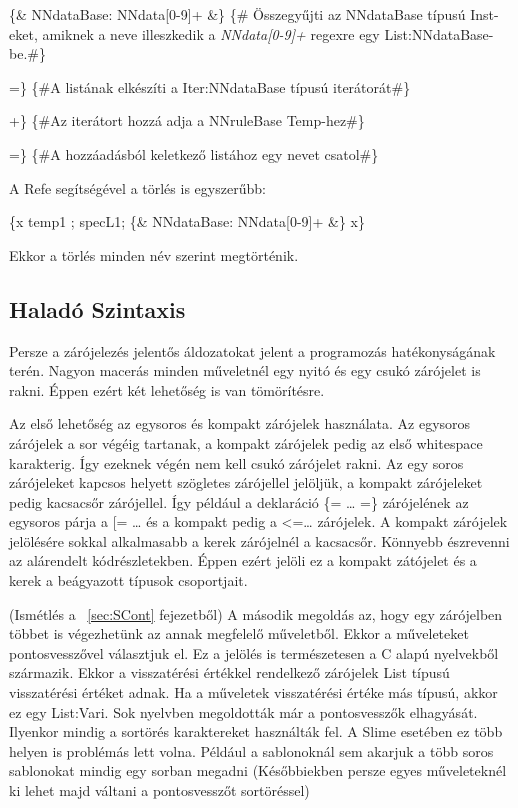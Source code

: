 {\{\& NNdataBase: NNdata[0-9]+ \&\} \{\# Összegyűjti az NNdataBase típusú Inst-eket, amiknek a neve illeszkedik a \textit{NNdata[0-9]+} regexre egy List:NNdataBase-be.\#\}

=\} \{\#A listának elkészíti a Iter:NNdataBase típusú iterátorát\#\}

+\} \{\#Az iterátort hozzá adja a NNruleBase Temp-hez\#\}

=\} \{\#A hozzáadásból keletkező listához egy nevet csatol\#\}

A Refe segítségével a törlés is egyszerűbb:

\{x temp1 ; specL1; \{\& NNdataBase: NNdata[0-9]+ \&\} x\}

Ekkor a törlés minden név szerint megtörténik.



\subsection{Haladó Szintaxis}
\label{sec:SAdvaSyntax}
Persze a zárójelezés jelentős áldozatokat jelent a programozás hatékonyságának terén. 
Nagyon macerás minden műveletnél egy nyitó és egy csukó zárójelet is rakni. 
Éppen ezért két lehetőség is van tömörítésre.

Az első lehetőség az egysoros és kompakt zárójelek használata. 
Az egysoros zárójelek a sor végéig tartanak, a kompakt zárójelek pedig az első whitespace karakterig. 
Így ezeknek végén nem kell csukó zárójelet rakni. 
Az egy soros zárójeleket kapcsos helyett szögletes zárójellel jelöljük, a kompakt zárójeleket pedig kacsacsőr zárójellel. 
Így például a deklaráció \{= … =\} zárójelének az egysoros párja a [= … és a kompakt pedig a <=… zárójelek.
A kompakt zárójelek jelölésére sokkal alkalmasabb a kerek zárójelnél a kacsacsőr.
Könnyebb észrevenni az alárendelt kódrészletekben.
Éppen ezért jelöli ez a kompakt zátójelet és a kerek a beágyazott típusok csoportjait.

(Ismétlés a ~\ref{sec:SCont} fejezetből)
A második megoldás az, hogy egy zárójelben többet is végezhetünk az annak megfelelő műveletből. 
Ekkor a műveleteket pontosvesszővel választjuk el.
Ez a jelölés is természetesen a C alapú nyelvekből származik.
Ekkor a visszatérési értékkel rendelkező zárójelek List típusú visszatérési értéket adnak.
Ha a műveletek visszatérési értéke más típusú, akkor ez egy List:Vari. 
Sok nyelvben megoldották már a pontosvesszők elhagyását.
Ilyenkor mindig a sortörés karaktereket használták fel.
A Slime  esetében ez több helyen is problémás lett volna.
Például a sablonoknál sem akarjuk a több soros sablonokat mindig egy sorban megadni
(Későbbiekben persze egyes műveleteknél ki lehet majd váltani a pontosvesszőt sortöréssel)

}
